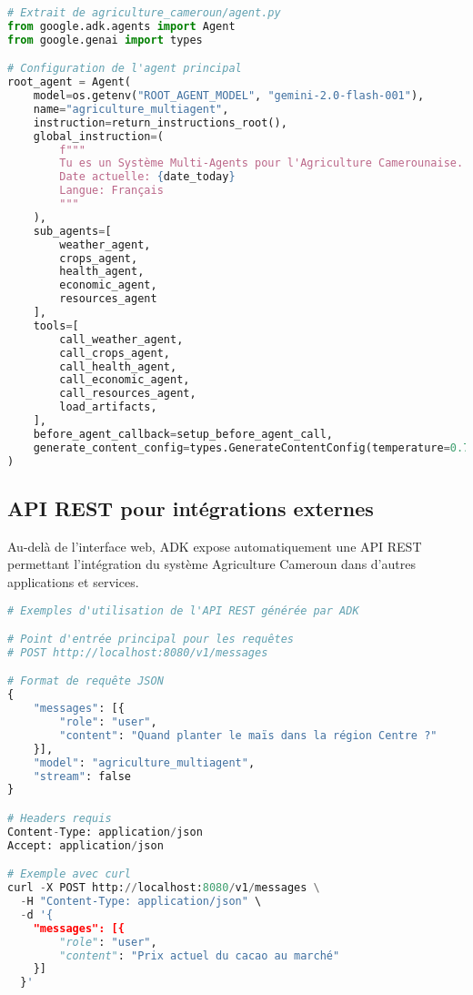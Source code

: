 \begin{lstlisting}[language=Python, caption=Configuration de l'agent principal pour l'interface]
# Extrait de agriculture_cameroun/agent.py
from google.adk.agents import Agent
from google.genai import types

# Configuration de l'agent principal
root_agent = Agent(
    model=os.getenv("ROOT_AGENT_MODEL", "gemini-2.0-flash-001"),
    name="agriculture_multiagent",
    instruction=return_instructions_root(),
    global_instruction=(
        f"""
        Tu es un Système Multi-Agents pour l'Agriculture Camerounaise.
        Date actuelle: {date_today}
        Langue: Français
        """
    ),
    sub_agents=[
        weather_agent,
        crops_agent,
        health_agent,
        economic_agent,
        resources_agent
    ],
    tools=[
        call_weather_agent,
        call_crops_agent,
        call_health_agent,
        call_economic_agent,
        call_resources_agent,
        load_artifacts,
    ],
    before_agent_callback=setup_before_agent_call,
    generate_content_config=types.GenerateContentConfig(temperature=0.7),
)
\end{lstlisting}

\subsection{API REST pour intégrations externes}

Au-delà de l'interface web, ADK expose automatiquement une API REST permettant l'intégration du système Agriculture Cameroun dans d'autres applications et services.

\begin{lstlisting}[language=Python, caption=Utilisation de l'API REST ADK]
# Exemples d'utilisation de l'API REST générée par ADK

# Point d'entrée principal pour les requêtes
# POST http://localhost:8080/v1/messages

# Format de requête JSON
{
    "messages": [{
        "role": "user",
        "content": "Quand planter le maïs dans la région Centre ?"
    }],
    "model": "agriculture_multiagent",
    "stream": false
}

# Headers requis
Content-Type: application/json
Accept: application/json

# Exemple avec curl
curl -X POST http://localhost:8080/v1/messages \
  -H "Content-Type: application/json" \
  -d '{
    "messages": [{
        "role": "user", 
        "content": "Prix actuel du cacao au marché"
    }]
  }'
\end{lstlisting}

